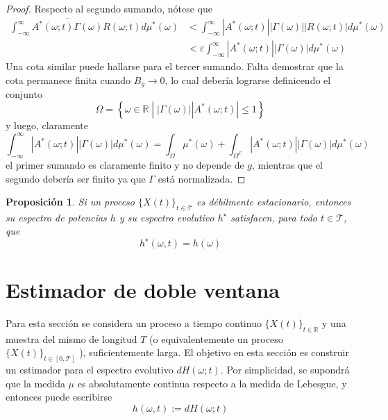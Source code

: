 \documentclass[12pt,letterpaper]{book}
\newtheorem{proposicion}[teorema]{Proposición}
\newcommand{\R}{\mathbb{R}}
\newcommand{\intR}{\int_{-\infty}^{\infty}}
\newcommand{\abso}[1]{\left| #1 \right|}
\newcommand{\xt}{$\{X(t)\}_{t\in \mathcal{T}}$ }
\newcommand{\xtin}[1]{$\{X(t)\}_{t\in \mathcal{ #1 }}$ }
\newcommand{\talque}{\mathrel{}\middle|\mathrel{}}
\begin{document}
\begin{proof}
Respecto al segundo sumando, nótese que 
\begin{align*}
\intR \overline{A^{*}(\omega; t) \Gamma(\omega)} R(\omega; t) d\mu^{*}(\omega)
&< \intR \abso{A^{*}(\omega; t)} \abso{ \Gamma(\omega)} \abso{R(\omega; t)} d\mu^{*}(\omega) \\
&< \varepsilon \intR \abso{A^{*}(\omega; t)}\abso{ \Gamma(\omega)} d\mu^{*}(\omega)
\end{align*}
Una cota similar puede hallarse para el tercer sumando.
Falta demostrar que la cota permanece finita cuando $B_g \rightarrow 0$, lo cual debería lograrse definicendo el conjunto
\begin{equation}
\Omega = \left\{ \omega \in \R \talque \abso{\Gamma(\omega)} \abso{A^{*}(\omega; t)} \leq 1 \right\} 
\end{equation}
y luego, claramente
\begin{equation}
\intR \abso{A^{*}(\omega; t)}\abso{ \Gamma(\omega)} d\mu^{*}(\omega) = 
\int_\Omega \mu^{*}(\omega) + 
\int_{\Omega^{C}} \abso{A^{*}(\omega; t)}\abso{ \Gamma(\omega)} d\mu^{*}(\omega)
\end{equation}
el primer sumando es claramente finito y no depende de $g$, mientras que el segundo debería ser finito ya que $\Gamma$ está normalizada.
\end{proof}

\begin{proposicion}
Si un proceso \xt es débilmente estacionario, entonces su espectro de potencias $h$ y su espectro evolutivo $h^{\star}$ satisfacen, para todo $t\in \mathcal{T}$, que
\begin{equation}
h^{\star}(\omega, t) = h(\omega)
\end{equation}
\label{lazy:redux}
\end{proposicion}


\section{Estimador de doble ventana}
\label{sec:doble_ventana}

Para esta sección se considera un proceso a tiempo continuo \xtin{\R} y una muestra del mismo de longitud $T$ (o equivalentemente un proceso \xtin{[0,T]}), suficientemente larga. El objetivo en esta sección es construir un estimador para el espectro evolutivo $dH(\omega; t)$.
%
Por simplicidad, se supondrá que la medida $\mu$ es absolutamente continua respecto a la medida de Lebesgue, y entonces puede escribirse
\begin{equation}
h(\omega,t) := dH(\omega; t)
\end{equation}
\end{document}
